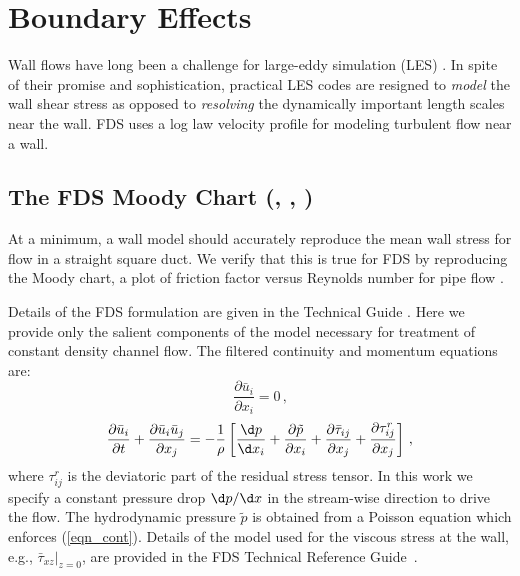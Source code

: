 \documentclass[11pt]{book}
\begin{document}
\chapter{Boundary Effects}

Wall flows have long been a challenge for large-eddy simulation (LES) \cite{Baggett:1997,Baggett:1998,Cabot:1995,Pope:2000,Sagaut:2001}.  In spite of their promise and sophistication, practical LES codes are resigned to \emph{model} the wall shear stress as opposed to \emph{resolving} the dynamically important length scales near the wall. FDS uses a log law velocity profile \cite{Pope:2000} for modeling turbulent flow near a wall.

\section{The FDS Moody Chart (\texorpdfstring{}{poiseuille}, \texorpdfstring{}{smoothwall}, \texorpdfstring{}{z0})}
\label{fds_moody_chart}

At a minimum, a wall model should accurately reproduce the mean wall stress for flow in a straight square duct.  We verify that this is true for FDS by reproducing the Moody chart, a plot of friction factor versus Reynolds number for pipe flow \cite{Moody:1944}.

Details of the FDS formulation are given in the Technical Guide \cite{FDS_Math_Guide}.  Here we provide only the salient components of the model necessary for treatment of constant density channel flow. The filtered continuity and momentum equations are:
\begin{equation}
\label{eqn_cont}
\frac{\partial \bar{u}_i}{\partial x_i} = 0 \,\mbox{,}
\end{equation}
\begin{equation}
\label{eqn_mom1}
\frac{\partial \bar{u}_i}{\partial t} + \frac{\partial \bar{u}_i \bar{u}_j}{\partial x_j} = -\frac{1}{\rho} \left[ \frac{\d p}{\d x_i} + \frac{\partial \tilde{p}}{\partial x_i} + \frac{\partial \bar{\tau}_{ij}}{\partial x_j} + \frac{\partial \tau_{ij}^{r}}{\partial x_j} \right]\,\mbox{,}
\end{equation}
where $\tau_{ij}^{r}$ is the deviatoric part of the residual stress tensor.  In this work we specify a constant pressure drop $\d p/\d x$ in the stream-wise direction to drive the flow.  The hydrodynamic pressure $\tilde{p}$ is obtained from a Poisson equation which enforces (\ref{eqn_cont}). Details of the model used for the viscous stress at the wall, e.g., $\bar{\tau}_{xz}|_{z=0}$, are provided in the FDS Technical Reference Guide~\cite{FDS_Tech_Guide}.
\end{document}
